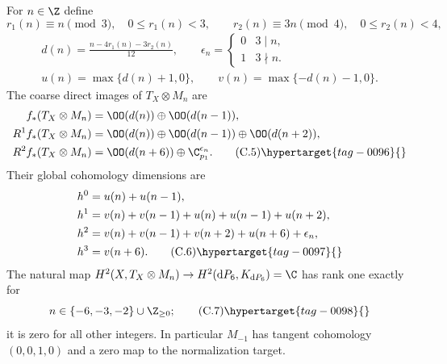 \begin{proposition}\hypertarget{tag-01FS}{}\label{cdp:st:C5b}

For $n\in\Z$ define
\[
 r_1(n)\equiv n\pmod3,\quad 0\le r_1(n)<3,
 \qquad r_2(n)\equiv3n\pmod4,\quad0\le r_2(n)<4,
\]
\begin{gather*}
 d(n)=\frac{n-4r_1(n)-3r_2(n)}{12},\qquad
 \epsilon_n=\begin{cases}0&3\mid n,\\1&3\nmid n.\end{cases}
\\
 u(n)=\max\{d(n)+1,0\},\qquad
 v(n)=\max\{-d(n)-1,0\}.
\end{gather*}
The coarse direct images of $T_X\otimes M_n$ are
\begin{align*}
 f_*(T_X\otimes M_n)&=\OO(d(n))\oplus\OO(d(n-1)),\\
 R^1f_*(T_X\otimes M_n)&=\OO(d(n))\oplus\OO(d(n-1))\oplus\OO(d(n+2)),\\
 R^2f_*(T_X\otimes M_n)&=\OO(d(n+6))\oplus\C_{p_1}^{\epsilon_n}.\tag{C.5}\hypertarget{tag-0096}{}\label{cdp:eq:C.5}
\end{align*}
Their global cohomology dimensions are
\begin{align*}
 h^0&=u(n)+u(n-1),\\
 h^1&=v(n)+v(n-1)+u(n)+u(n-1)+u(n+2),\\
 h^2&=v(n)+v(n-1)+v(n+2)+u(n+6)+\epsilon_n,\\
 h^3&=v(n+6).                                             \tag{C.6}\hypertarget{tag-0097}{}\label{cdp:eq:C.6}
\end{align*}
The natural map $H^2(X,T_X\otimes M_n)\to H^2(\mathrm dP_6,K_{\mathrm dP_6})=\C$ has rank one exactly for
\[
 n\in\{-6,-3,-2\}\cup\Z_{\ge0};                         \tag{C.7}\hypertarget{tag-0098}{}\label{cdp:eq:C.7}
\]
it is zero for all other integers. In particular $M_{-1}$ has tangent cohomology $(0,0,1,0)$ and a zero map to the normalization target.
\end{proposition}



